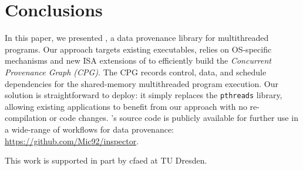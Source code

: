 \section{Conclusions}
\label{sec:conclusion}

In this paper, we presented \projecttitle, a data provenance library for multithreaded programs. Our approach targets existing executables, relies on OS-specific mechanisms and new ISA extensions of \intelpt  to efficiently build the {\em Concurrent Provenance Graph (CPG)}. The CPG records control, data, and schedule dependencies for the shared-memory multithreaded program execution. Our solution is straightforward to deploy: it simply replaces the {\tt pthreads} library, allowing existing applications to benefit from our approach with no re-compilation or code changes.  \projecttitle's source code is publicly available for further use in a wide-range of workflows for data provenance:  \href{https://github.com/Mic92/inspector}{ https://github.com/Mic92/inspector}.

 This work is supported in part by cfaed at TU Dresden.

 

